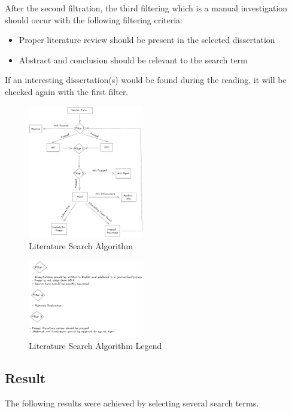 \documentclass[9pt,conference]{IEEEtran}
\begin{document}
    After the second filtration, the third filtering which is a manual investigation should occur with the following filtering criteria:
    \begin{itemize}
        \item Proper literature review should be present in the selected dissertation
        \item Abstract and conclusion should be relevant to the search term
    \end{itemize}
    
    If an interesting dissertation(s) would be found during the reading, it will be checked again with the first filter.
    \begin{figure}
        \centering
        \includegraphics[width =0.45\textwidth]{LRMethod.png}
        \caption{Literature Search Algorithm}
        \label{fig:literaturesearchalgorithm}
    \end{figure} 
    \begin{figure}
        \centering
        \includegraphics[width =0.45\textwidth]{LRMethodLegacy.png}
        \caption{Literature Search Algorithm Legend}
        \label{fig:literaturesearchalgorithmlegend}
    \end{figure}
    
    \subsection{Result}
    \label{section:liteature_result}
    The following results were achieved by selecting several search terms.
    
\end{document}
